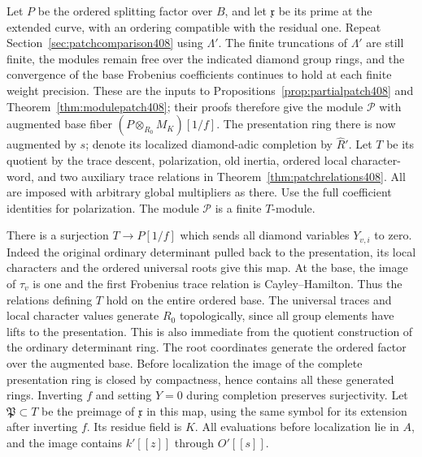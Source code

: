 \documentclass[a4paper,11pt]{article}
\theoremstyle{definition}
\theoremstyle{remark}
\numberwithin{equation}{section}
\begin{document}
Let \(P\) be the ordered splitting factor over \(B\), and
let \(\mathfrak x\) be its prime at the extended curve,
with an ordering compatible with the residual one.
Repeat Section~\ref{sec:patchcomparison408} using \(\Lambda'\).
The finite truncations of \(\Lambda'\) are still finite, the
modules remain free over the indicated diamond group rings,
and the convergence of the base Frobenius coefficients
continues to hold at each finite weight precision. These
are the inputs to Propositions~\ref{prop:partialpatch408}
and Theorem~\ref{thm:modulepatch408}; their proofs therefore
give the module \(\mathcal P\) with augmented base fiber
\((P\otimes_{R_0}M_K)[1/f]\). The presentation ring there
is now augmented by \(s\); denote its localized
diamond-adic completion by \(\widehat R'\).
Let \(T\) be its quotient by the trace descent, polarization,
old inertia, ordered local character-word, and two auxiliary
trace relations in Theorem~\ref{thm:patchrelations408}.
All are imposed with arbitrary global multipliers as there.
Use the full coefficient identities for polarization. The
module \(\mathcal P\) is a finite \(T\)-module.

There is a surjection \(T\to P[1/f]\) which sends all
diamond variables \(Y_{v,i}\) to zero. Indeed the original
ordinary determinant pulled back to the presentation, its
local characters and the ordered universal roots give this
map. At the base, the image of \(\tau_v\) is one and the
first Frobenius trace relation is Cayley--Hamilton. Thus
the relations defining \(T\) hold on the entire ordered
base. The universal traces and local character values
generate \(R_0\) topologically, since all group elements
have lifts to the presentation. This is also immediate
from the quotient construction of the ordinary determinant
ring. The root coordinates generate the ordered factor
over the augmented base. Before localization the image of
the complete presentation ring is closed by compactness,
hence contains all these generated rings. Inverting \(f\)
and setting \(Y=0\) during completion preserves surjectivity.
Let \(\mathfrak P\subset T\) be the preimage of \(\mathfrak x\)
in this map, using the same symbol for its extension after
inverting \(f\). Its residue field is \(K\). All evaluations
before localization lie in \(A\), and the image contains
\(k'[[z]]\) through \(O'[[s]]\).
\end{document}
